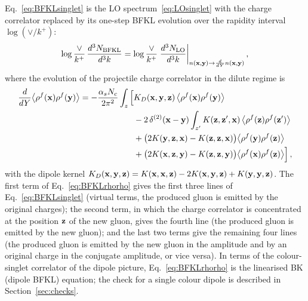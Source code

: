 Eq.~\eqref{eq:BFKLsinglet} is the LO spectrum~\eqref{eq:LOsinglet} with the charge correlator replaced by its one-step BFKL evolution over the rapidity interval $\log(\vee/k^+)$:
\begin{align}\label{eq:BFKLasLO}
\log\frac{\vee}{k^+}\,\frac{d^3N_{\rm BFKL}}{d^3k}=\log\frac{\vee}{k^+}\;\frac{d^3N_{\rm LO}}{d^3k}\bigg|_{n(\mathbf{x},\mathbf{y})\to\frac{d}{dY}n(\mathbf{x},\mathbf{y})}\,,
\end{align}
where the evolution of the projectile charge correlator in the dilute regime is~\cite{Kovner:2006wr,Kovner:2006ge}
\begin{align}\label{eq:BFKLrhorho}
\frac{d}{dY}\big\langle\rho^f(\mathbf{x})\rho^f(\mathbf{y})\big\rangle=-\frac{\alpha_sN_c}{2\pi^2}\int_z\Big[&K_D(\mathbf{x},\mathbf{y},\mathbf{z})\,\big\langle\rho^f(\mathbf{x})\rho^f(\mathbf{y})\big\rangle
\notag\\&-2\,\delta^{(2)}(\mathbf{x}-\mathbf{y})\int_{z'}K(\mathbf{z},\mathbf{z}',\mathbf{x})\,\big\langle\rho^f(\mathbf{z})\rho^f(\mathbf{z}')\big\rangle
\notag\\&
+\big(2K(\mathbf{y},\mathbf{z},\mathbf{x})-K(\mathbf{z},\mathbf{z},\mathbf{x})\big)\big\langle\rho^f(\mathbf{y})\rho^f(\mathbf{z})\big\rangle
\notag\\&+\big(2K(\mathbf{x},\mathbf{z},\mathbf{y})-K(\mathbf{z},\mathbf{z},\mathbf{y})\big)\big\langle\rho^f(\mathbf{x})\rho^f(\mathbf{z})\big\rangle\Big]\,,
\end{align}
with the dipole kernel $K_D(\mathbf{x},\mathbf{y},\mathbf{z})=K(\mathbf{x},\mathbf{x},\mathbf{z})-2K(\mathbf{x},\mathbf{y},\mathbf{z})+K(\mathbf{y},\mathbf{y},\mathbf{z})$. The first term of Eq.~\eqref{eq:BFKLrhorho} gives the first three lines of Eq.~\eqref{eq:BFKLsinglet} (virtual terms, the produced gluon is emitted by the original charges); the second term, in which the charge correlator is concentrated at the position $\mathbf{z}$ of the new gluon, gives the fourth line (the produced gluon is emitted by the new gluon); and the last two terms give the remaining four lines (the produced gluon is emitted by the new gluon in the amplitude and by an original charge in the conjugate amplitude, or vice versa). In terms of the colour-singlet correlator of the dipole picture, Eq.~\eqref{eq:BFKLrhorho} is the linearised BK (dipole BFKL) equation; the check for a single colour dipole is described in Section~\ref{sec:checks}.

